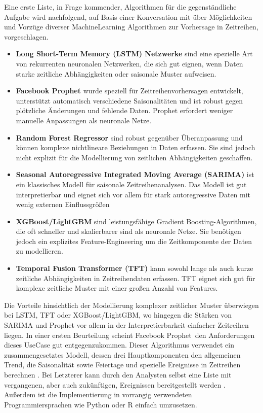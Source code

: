 Eine erste Liste, in Frage kommender, Algorithmen für die gegenständliche Aufgabe wird nachfolgend, auf Basis einer Konversation mit \cite{chatgpt2024} über Möglichkeiten und Vorzüge diverser MachineLearning Algorithmen zur Vorhersage in Zeitreihen, vorgeschlagen. 

\begin{itemize}
 \itemsep-8pt
 \item \textbf{Long Short-Term Memory (LSTM) Netzwerke} sind eine spezielle Art von rekurrenten neuronalen Netzwerken, die sich gut eignen, wenn Daten starke zeitliche Abhängigkeiten oder saisonale Muster aufweisen.
 \item \textbf{Facebook Prophet} wurde speziell für Zeitreihenvorhersagen entwickelt, unterstützt automatisch verschiedene Saisonalitäten und ist robust gegen plötzliche Änderungen und fehlende Daten. Prophet erfordert weniger manuelle Anpassungen als neuronale Netze.
 \item \textbf{Random Forest Regressor} sind robust gegenüber Überanpassung und können komplexe nichtlineare Beziehungen in Daten erfassen. Sie sind jedoch nicht explizit für die Modellierung von zeitlichen Abhängigkeiten geschaffen.
 \item \textbf{Seasonal Autoregressive Integrated Moving Average (SARIMA)} ist ein klassisches Modell für saisonale Zeitreihenanalysen. Das Modell ist gut interpretierbar und eignet sich vor allem für stark autoregressive Daten mit wenig externen Einflussgrößen
 \item \textbf{XGBoost/LightGBM} sind leistungsfähige Gradient Boosting-Algorithmen, die oft schneller und skalierbarer sind als neuronale Netze. Sie benötigen jedoch ein explizites Feature-Engineering um die Zeitkomponente der Daten zu modellieren.
 \item \textbf{Temporal Fusion Transformer (TFT)} kann sowohl lange als auch kurze zeitliche Abhängigkeiten in Zeitreihendaten erfassen. TFT eignet sich gut für komplexe zeitliche Muster mit einer großen Anzahl von Features.
\end{itemize} 

Die Vorteile hinsichtlich der Modellierung komplexer zeitlicher Muster überwiegen bei LSTM, TFT oder XGBoost/LightGBM, wo hingegen die Stärken von SARIMA und Prophet vor allem in der Interpretierbarkeit einfacher Zeitreihen liegen. In einer ersten Beurteilung scheint \glqq Facebook Prophet\grqq\ den Anforderungen dieses UseCase gut entgegenzukommen. Dieser Algorithmus verwendet ein zusammengesetztes Modell, dessen drei Hauptkomponenten den allgemeinen Trend, die Saisonalität sowie Feiertage und spezielle Ereignisse in Zeitreihen berechnen \citep[S.7]{taylor_forecasting_2017}. Bei Letzterer kann durch den Analysten selbst eine Liste mit vergangenen, aber auch zukünftigen, Ereignissen bereitgestellt werden \citep[S.12]{taylor_forecasting_2017}. Außerdem ist die Implementierung in vorrangig verwendeten Programmiersprachen wie Python oder R einfach umzusetzen.

